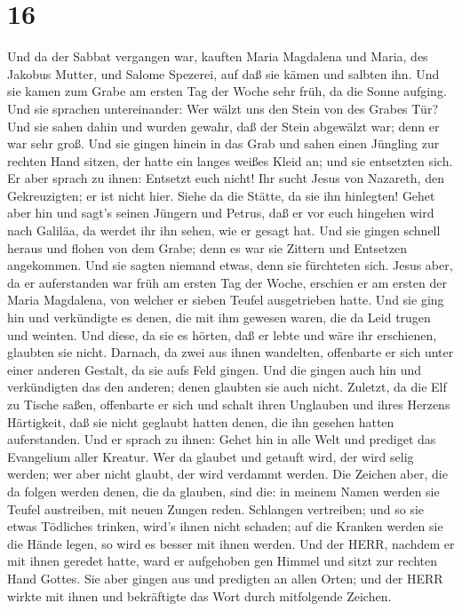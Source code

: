 \hypertarget{section-15}{%
\section{16}\label{section-15}}

 Und da der Sabbat vergangen war, kauften Maria Magdalena
und Maria, des Jakobus Mutter, und Salome Spezerei, auf daß sie kämen
und salbten ihn.  Und sie kamen zum Grabe am ersten Tag der
Woche sehr früh, da die Sonne aufging.  Und sie sprachen
untereinander: Wer wälzt uns den Stein von des Grabes Tür? 
Und sie sahen dahin und wurden gewahr, daß der Stein abgewälzt war; denn
er war sehr groß.  Und sie gingen hinein in das Grab und
sahen einen Jüngling zur rechten Hand sitzen, der hatte ein langes
weißes Kleid an; und sie entsetzten sich.  Er aber sprach zu
ihnen: Entsetzt euch nicht! Ihr sucht Jesus von Nazareth, den
Gekreuzigten; er ist nicht hier. Siehe da die Stätte, da sie ihn
hinlegten!  Gehet aber hin und sagt's seinen Jüngern und
Petrus, daß er vor euch hingehen wird nach Galiläa, da werdet ihr ihn
sehen, wie er gesagt hat.  Und sie gingen schnell heraus und
flohen von dem Grabe; denn es war sie Zittern und Entsetzen angekommen.
Und sie sagten niemand etwas, denn sie fürchteten sich. 
Jesus aber, da er auferstanden war früh am ersten Tag der Woche,
erschien er am ersten der Maria Magdalena, von welcher er sieben Teufel
ausgetrieben hatte.  Und sie ging hin und verkündigte es
denen, die mit ihm gewesen waren, die da Leid trugen und weinten.
 Und diese, da sie es hörten, daß er lebte und wäre ihr
erschienen, glaubten sie nicht.  Darnach, da zwei aus ihnen
wandelten, offenbarte er sich unter einer anderen Gestalt, da sie aufs
Feld gingen.  Und die gingen auch hin und verkündigten das
den anderen; denen glaubten sie auch nicht.  Zuletzt, da
die Elf zu Tische saßen, offenbarte er sich und schalt ihren Unglauben
und ihres Herzens Härtigkeit, daß sie nicht geglaubt hatten denen, die
ihn gesehen hatten auferstanden.  Und er sprach zu ihnen:
Gehet hin in alle Welt und prediget das Evangelium aller Kreatur.
 Wer da glaubet und getauft wird, der wird selig werden;
wer aber nicht glaubt, der wird verdammt werden.  Die
Zeichen aber, die da folgen werden denen, die da glauben, sind die: in
meinem Namen werden sie Teufel austreiben, mit neuen Zungen reden.
 Schlangen vertreiben; und so sie etwas Tödliches trinken,
wird's ihnen nicht schaden; auf die Kranken werden sie die Hände legen,
so wird es besser mit ihnen werden.  Und der HERR, nachdem
er mit ihnen geredet hatte, ward er aufgehoben gen Himmel und sitzt zur
rechten Hand Gottes.  Sie aber gingen aus und predigten an
allen Orten; und der HERR wirkte mit ihnen und bekräftigte das Wort
durch mitfolgende Zeichen.
